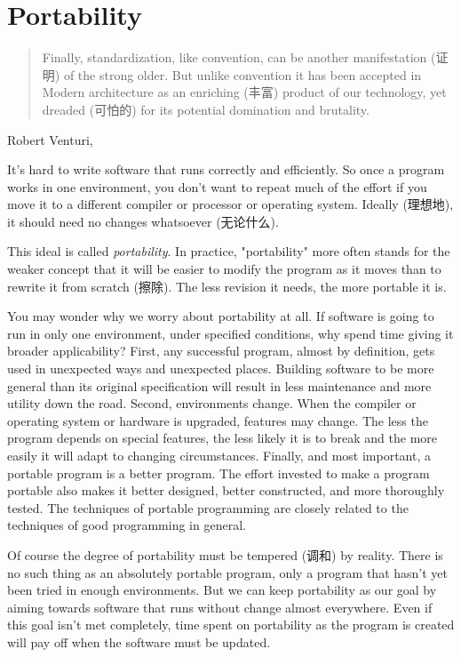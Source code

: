 \chapter{Portability}
\label{chap:portability}
\begin{quote}
    Finally, standardization, like convention, can be another manifestation
    (证明) of the strong older. But unlike convention it has been accepted
    in Modern architecture as an enriching (丰富) product of our
    technology, yet dreaded (可怕的) for its potential domination and
    brutality.
\end{quote}
\begin{quotesrc}
    Robert Venturi, 
\end{quotesrc}

It's hard to write software that runs correctly and efficiently. So once a
program works in one environment, you don't want to repeat much of the
effort if you move it to a different compiler or processor or operating
system. Ideally (理想地), it should need no changes whatsoever (无论什么).

This ideal is called \emph{portability}. In practice, "portability" more
often stands for the weaker concept that it will be easier to modify the
program as it moves than to rewrite it from scratch (擦除). The less
revision it needs, the more portable it is.

You may wonder why we worry about portability at all. If software is going
to run in only one environment, under specified conditions, why spend time
giving it broader applicability? First, any successful program, almost by
definition, gets used in unexpected ways and unexpected places. Building
software to be more general than its original specification will result in
less maintenance and more utility down the road. Second, environments
change. When the compiler or operating system or hardware is upgraded,
features may change. The less the program depends on special features, the
less likely it is to break and the more easily it will adapt to changing
circumstances. Finally, and most important, a portable program is a better
program. The effort invested to make a program portable also makes it
better designed, better constructed, and more thoroughly tested. The
techniques of portable programming are closely related to the techniques of
good programming in general.

Of course the degree of portability must be tempered (调和) by reality.
There is no such thing as an absolutely portable program, only a program
that hasn't yet been tried in enough environments. But we can keep
portability as our goal by aiming towards software that runs without change
almost everywhere. Even if this goal isn't met completely, time spent on
portability as the program is created will pay off when the software must
be updated.

